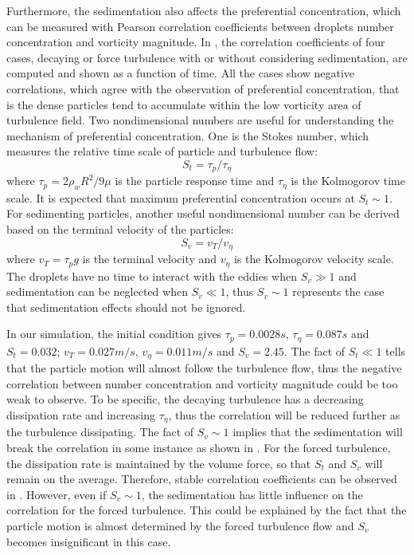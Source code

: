 \documentclass[draft,jgrga]{AGUTeX}
\begin{document}
\begin{article}
Furthermore, the sedimentation also affects the preferential concentration, which can be measured with Pearson correlation coefficients between droplets number concentration and vorticity magnitude. In , the correlation coefficients of four cases, decaying or force turbulence with or without considering sedimentation, are computed and shown as a function of time. All the cases show negative correlations, which agree with the observation of preferential concentration, that is the dense particles tend to accumulate within the low vorticity area of turbulence field. Two nondimensional numbers are useful for understanding the mechanism of preferential concentration. One is the Stokes number, which measures the relative time scale of particle and turbulence flow:
\begin{equation}
S_t = \tau_p/\tau_{\eta}
\end{equation}
where $\tau_p = 2\rho_wR^2/9\mu$ is the particle response time and $\tau_{\eta}$ is the Kolmogorov time scale. It is expected that maximum preferential concentration occurs at $S_t \sim 1$. 
For sedimenting particles, another useful nondimensional number can be derived based on the terminal velocity of the particles:
\begin{equation}
S_v = v_T/v_{\eta}
\end{equation}
where $v_T = \tau_p g$ is the terminal velocity and $v_{\eta}$ is the Kolmogorov velocity scale. The droplets have no time to interact with the eddies when $S_v \gg 1$ and sedimentation can be neglected when $S_v \ll 1$, thus $S_v \sim 1$ represents the case that sedimentation effects should not be ignored.

In our simulation, the initial condition gives $\tau_p = 0.0028 s$, $\tau_\eta = 0.087s$ and $S_t = 0.032$; $v_T = 0.027 m/s$, $v_{\eta} = 0.011 m/s$ and $S_v = 2.45$. The fact of $S_t \ll 1$ tells that the particle motion will 
almost follow the turbulence flow, thus the negative correlation between number concentration and vorticity 
magnitude could be too weak to observe. To be specific, the decaying turbulence has a decreasing dissipation rate 
and increasing $\tau_{\eta}$, thus the correlation will be reduced further as the turbulence dissipating. The fact of $S_v \sim 1$ implies that the sedimentation will break the correlation in some instance as shown in . For the forced turbulence, the dissipation rate is maintained by the volume force, so that $S_t$ and $S_v$ will remain on the average. Therefore, stable correlation coefficients can be observed in . However, even if $S_v \sim 1$, the sedimentation has little influence on the correlation for the forced turbulence. This could be explained by the fact that the particle motion is almost determined by the forced turbulence flow and $S_v$ becomes insignificant in this case.   


\end{article}
\end{document}
